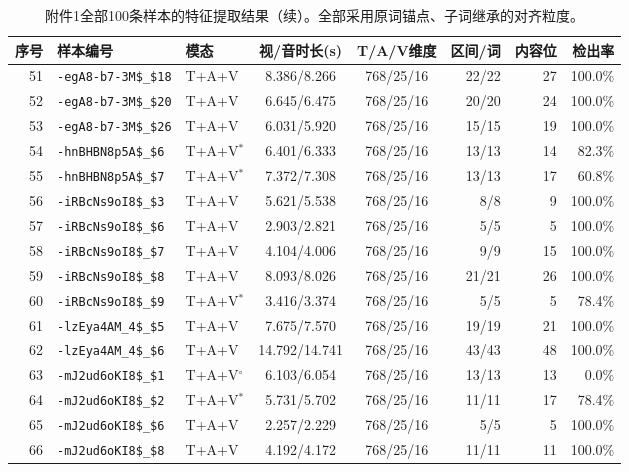 \begin{table}[!ht]
\centering
\ContinuedFloat
\caption{附件1全部100条样本的特征提取结果（续）。全部采用原词锚点、子词继承的对齐粒度。}
\fontsize{8.5}{11}\selectfont
\setlength{\tabcolsep}{3pt}
\renewcommand{\arraystretch}{1.12}
\begin{tabular}{rllccrrr}
\toprule
序号 & 样本编号 & 模态 & 视/音时长(s) & T/A/V维度 & 区间/词 & 内容位 & 检出率 \\
\midrule
51 & \texttt{-egA8-b7-3M\$\_\$18} & T+A+V & 8.386/8.266 & 768/25/16 & 22/22 & 27 & 100.0\% \\
52 & \texttt{-egA8-b7-3M\$\_\$20} & T+A+V & 6.645/6.475 & 768/25/16 & 20/20 & 24 & 100.0\% \\
53 & \texttt{-egA8-b7-3M\$\_\$26} & T+A+V & 6.031/5.920 & 768/25/16 & 15/15 & 19 & 100.0\% \\
54 & \texttt{-hnBHBN8p5A\$\_\$6} & T+A+V$^{*}$ & 6.401/6.333 & 768/25/16 & 13/13 & 14 & 82.3\% \\
55 & \texttt{-hnBHBN8p5A\$\_\$7} & T+A+V$^{*}$ & 7.372/7.308 & 768/25/16 & 13/13 & 17 & 60.8\% \\
56 & \texttt{-iRBcNs9oI8\$\_\$3} & T+A+V & 5.621/5.538 & 768/25/16 & 8/8 & 9 & 100.0\% \\
57 & \texttt{-iRBcNs9oI8\$\_\$6} & T+A+V & 2.903/2.821 & 768/25/16 & 5/5 & 5 & 100.0\% \\
58 & \texttt{-iRBcNs9oI8\$\_\$7} & T+A+V & 4.104/4.006 & 768/25/16 & 9/9 & 15 & 100.0\% \\
59 & \texttt{-iRBcNs9oI8\$\_\$8} & T+A+V & 8.093/8.026 & 768/25/16 & 21/21 & 26 & 100.0\% \\
60 & \texttt{-iRBcNs9oI8\$\_\$9} & T+A+V$^{*}$ & 3.416/3.374 & 768/25/16 & 5/5 & 5 & 78.4\% \\
61 & \texttt{-lzEya4AM\_4\$\_\$5} & T+A+V & 7.675/7.570 & 768/25/16 & 19/19 & 21 & 100.0\% \\
62 & \texttt{-lzEya4AM\_4\$\_\$6} & T+A+V & 14.792/14.741 & 768/25/16 & 43/43 & 48 & 100.0\% \\
63 & \texttt{-mJ2ud6oKI8\$\_\$1} & T+A+V$^{\circ}$ & 6.103/6.054 & 768/25/16 & 13/13 & 13 & 0.0\% \\
64 & \texttt{-mJ2ud6oKI8\$\_\$2} & T+A+V$^{*}$ & 5.731/5.702 & 768/25/16 & 11/11 & 17 & 78.4\% \\
65 & \texttt{-mJ2ud6oKI8\$\_\$6} & T+A+V & 2.257/2.229 & 768/25/16 & 5/5 & 5 & 100.0\% \\
66 & \texttt{-mJ2ud6oKI8\$\_\$8} & T+A+V & 4.192/4.172 & 768/25/16 & 11/11 & 11 & 100.0\% \\

\end{tabular}
\end{table}
